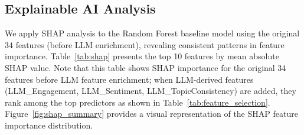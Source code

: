 \documentclass[journal]{IEEEtran}
\begin{document}
\begin{table}[h]
\centering
\caption{AHFS-TA Improvement Over Baselines}
\label{tab:improvement}
\end{table}

\subsection{Explainable AI Analysis}

We apply SHAP analysis to the Random Forest baseline model using the original 34 features (before LLM enrichment), revealing consistent patterns in feature importance. Table~\ref{tab:shap} presents the top 10 features by mean absolute SHAP value. Note that this table shows SHAP importance for the original 34 features before LLM feature enrichment; when LLM-derived features (LLM\_Engagement, LLM\_Sentiment, LLM\_TopicConsistency) are added, they rank among the top predictors as shown in Table~\ref{tab:feature_selection}. Figure~\ref{fig:shap_summary} provides a visual representation of the SHAP feature importance distribution.

\begin{table}[h]
\centering
\caption{Top 10 SHAP Feature Importance (Original Features)}
\label{tab:shap}
\end{table}
\end{document}
